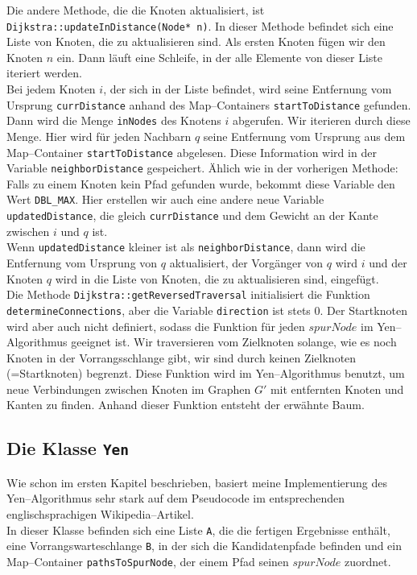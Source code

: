 \documentclass[a4paper,10pt,ngerman]{scrartcl}
\begin{document}
Die andere Methode, die die Knoten aktualisiert, ist \texttt{Dijkstra::updateInDistance(Node* n)}.
In dieser Methode befindet sich eine Liste von Knoten, die zu aktualisieren sind.
Als ersten Knoten fügen wir den Knoten $n$ ein.
Dann läuft eine Schleife, in der alle Elemente von dieser Liste iteriert werden.\\
Bei jedem Knoten $i$, der sich in der Liste befindet, wird seine Entfernung vom Ursprung \texttt{currDistance}
anhand des Map--Containers \texttt{startToDistance} gefunden. 
Dann wird die Menge \texttt{inNodes} des Knotens $i$ abgerufen.
Wir iterieren durch diese Menge.
Hier wird für jeden Nachbarn $q$ seine Entfernung vom Ursprung aus dem Map--Container \texttt{startToDistance} abgelesen.
Diese Information wird in der Variable \texttt{neighborDistance} gespeichert.
Ählich wie in der vorherigen Methode: Falls zu einem Knoten kein Pfad gefunden wurde,
bekommt diese Variable den Wert \texttt{DBL\_MAX}.
Hier erstellen wir auch eine andere neue Variable \texttt{updatedDistance}, die gleich
\texttt{currDistance} und dem Gewicht an der Kante zwischen $i$ und $q$ ist.\\
Wenn \texttt{updatedDistance} kleiner ist als \texttt{neighborDistance}, dann 
wird die Entfernung vom Ursprung von $q$ aktualisiert, der Vorgänger von $q$
wird $i$ und der Knoten $q$ wird in die Liste von Knoten, die zu aktualisieren sind, eingefügt.\\

Die Methode \texttt{Dijkstra::getReversedTraversal} in­i­ti­a­li­sie­rt die Funktion \texttt{determineConnections},
aber die Variable \texttt{direction} ist stets 0. Der Startknoten wird aber auch nicht definiert, sodass
die Funktion für jeden $spurNode$ im Yen--Algorithmus geeignet ist.
Wir traversieren vom Zielknoten solange, wie es noch Knoten in der Vorrangsschlange gibt, wir sind durch keinen
Zielknoten (=Startknoten) begrenzt. Diese Funktion wird im Yen--Algorithmus benutzt, um neue Verbindungen zwischen Knoten im Graphen
$G'$ mit entfernten Knoten und Kanten zu finden. Anhand dieser Funktion entsteht der erwähnte Baum.

\subsection{Die Klasse \texttt{Yen}}
Wie schon im ersten Kapitel beschrieben, basiert meine Implementierung des Yen--Algorithmus sehr stark auf dem Pseudocode
im entsprechenden englischsprachigen Wikipedia–Artikel.\\
In dieser Klasse befinden sich eine Liste \texttt{A}, die die fertigen Ergebnisse enthält, eine Vorrangswarteschlange
\texttt{B}, in der sich die Kandidatenpfade befinden und ein Map--Container \texttt{pathsToSpurNode}, der einem Pfad
seinen $spurNode$ zuordnet.\\
\end{document}
